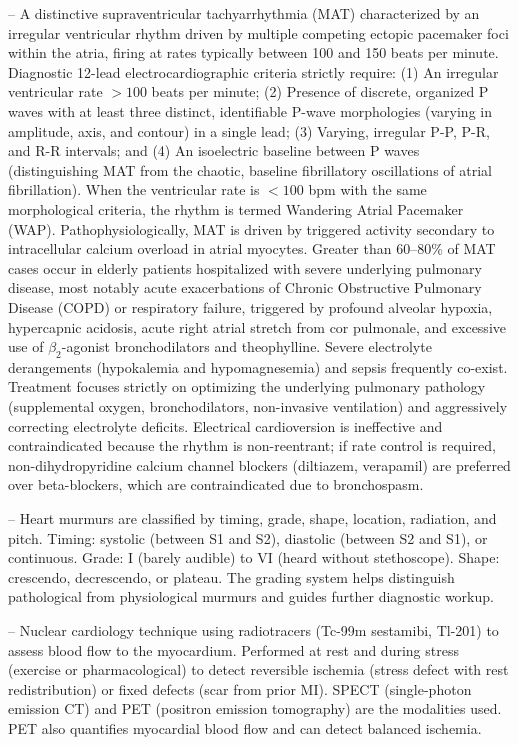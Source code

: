 -- A distinctive supraventricular tachyarrhythmia (MAT) characterized by an irregular ventricular rhythm driven by multiple competing ectopic pacemaker foci within the atria, firing at rates typically between 100 and 150 beats per minute. Diagnostic 12-lead electrocardiographic criteria strictly require: (1) An irregular ventricular rate $>100$ beats per minute; (2) Presence of discrete, organized P waves with at least three distinct, identifiable P-wave morphologies (varying in amplitude, axis, and contour) in a single lead; (3) Varying, irregular P-P, P-R, and R-R intervals; and (4) An isoelectric baseline between P waves (distinguishing MAT from the chaotic, baseline fibrillatory oscillations of atrial fibrillation). When the ventricular rate is $<100$ bpm with the same morphological criteria, the rhythm is termed Wandering Atrial Pacemaker (WAP). Pathophysiologically, MAT is driven by triggered activity secondary to intracellular calcium overload in atrial myocytes. Greater than 60--80\% of MAT cases occur in elderly patients hospitalized with severe underlying pulmonary disease, most notably acute exacerbations of Chronic Obstructive Pulmonary Disease (COPD) or respiratory failure, triggered by profound alveolar hypoxia, hypercapnic acidosis, acute right atrial stretch from cor pulmonale, and excessive use of $\beta_2$-agonist bronchodilators and theophylline. Severe electrolyte derangements (hypokalemia and hypomagnesemia) and sepsis frequently co-exist. Treatment focuses strictly on optimizing the underlying pulmonary pathology (supplemental oxygen, bronchodilators, non-invasive ventilation) and aggressively correcting electrolyte deficits. Electrical cardioversion is ineffective and contraindicated because the rhythm is non-reentrant; if rate control is required, non-dihydropyridine calcium channel blockers (diltiazem, verapamil) are preferred over beta-blockers, which are contraindicated due to bronchospasm.

-- Heart murmurs are classified by timing, grade, shape, location, radiation, and pitch. Timing: systolic (between S1 and S2), diastolic (between S2 and S1), or continuous. Grade: I (barely audible) to VI (heard without stethoscope). Shape: crescendo, decrescendo, or plateau. The grading system helps distinguish pathological from physiological murmurs and guides further diagnostic workup.

-- Nuclear cardiology technique using radiotracers (Tc-99m sestamibi, Tl-201) to assess blood flow to the myocardium. Performed at rest and during stress (exercise or pharmacological) to detect reversible ischemia (stress defect with rest redistribution) or fixed defects (scar from prior MI). SPECT (single-photon emission CT) and PET (positron emission tomography) are the modalities used. PET also quantifies myocardial blood flow and can detect balanced ischemia.

